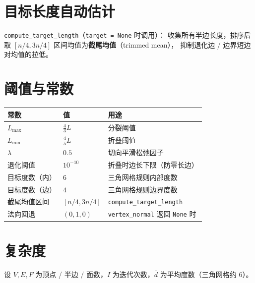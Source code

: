 \documentclass[11pt,a4paper]{article}
\begin{document}
\section{目标长度自动估计}

\texttt{compute\_target\_length}（\texttt{target = None} 时调用）：
收集所有半边长度，排序后取 $[n/4, 3n/4]$ 区间均值为\textbf{截尾均值}（trimmed mean），
抑制退化边 / 边界短边对均值的拉低。

\section{阈值与常数}

\begin{center}
\renewcommand{\arraystretch}{1.18}
\begin{tabular}{@{}lll@{}}
  \toprule
  \textbf{常数} & \textbf{值} & \textbf{用途} \\
  \midrule
  $L_{\max}$ & $\frac{4}{3} L$ & 分裂阈值 \\
  $L_{\min}$ & $\frac{4}{5} L$ & 折叠阈值 \\
  $\lambda$  & $0.5$           & 切向平滑松弛因子 \\
  退化阈值    & $10^{-10}$      & 折叠时边长下限（防零长边） \\
  目标度数（内） & $6$          & 三角网格规则内部度数 \\
  目标度数（边） & $4$          & 三角网格规则边界度数 \\
  截尾均值区间 & $[n/4, 3n/4]$ & \texttt{compute\_target\_length} \\
  法向回退    & $(0, 1, 0)$     & \texttt{vertex\_normal} 返回 \texttt{None} 时 \\
  \bottomrule
\end{tabular}
\end{center}

\section{复杂度}

设 $V, E, F$ 为顶点 / 半边 / 面数，$I$ 为迭代次数，$\bar{d}$ 为平均度数（三角网格约 6）。
\end{document}

